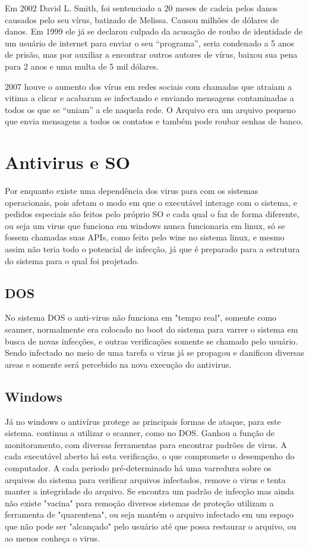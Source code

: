 	Em 2002 David L. Smith, foi sentenciado a 20 meses de cadeia pelos danos causados pelo seu vírus, batizado de Melissa. Causou milhões de dólares de danos. Em 1999 ele já se declarou culpado da acusação de roubo de identidade de um usuário de internet para enviar o seu “programa”, seria condenado a 5 anos de prisão, mas por auxiliar a encontrar outros autores de vírus, baixou sua pena para 2 anos e uma multa de 5 mil dólares.

	2007 houve o aumento dos vírus em redes sociais com chamadas que atraiam a vitima a clicar e acabaram se infectando e enviando mensagens contaminadas a todos os que se “uniam” a ele naquela rede. O Arquivo era um arquivo pequeno que envia mensagens a todos os contatos e também pode roubar senhas de banco.

\section{Antivirus e SO}
Por enquanto existe uma dependência dos virus para com os sistemas operacionais, pois afetam o modo em que o executável interage com o sistema, e pedidos especiais são feitos pelo próprio SO e cada qual o faz de forma diferente, ou seja um virus que funciona em windows nunca funcionaria em linux, só se fossem chamadas suas APIs, como feito pelo wine no sistema linux, e mesmo assim não teria todo o potencial de infecção, já que é preparado para a estrutura do sistema para o qual foi projetado.

\subsection{DOS}
No sistema DOS o anti-virus não funciona em "tempo real", somente como scanner, normalmente era colocado no boot do sistema para varrer o sistema em busca de novas infecções, e outras verificações somente se chamado pelo usuário. Sendo infectado no meio de uma tarefa o virus já se propagou e danificou diversas areas e somente será percebido na nova execução do antivirus.

\subsection{Windows}
Já no windows o antivírus protege as principais formas de ataque, para este sistema. 
continua a utilizar o scanner, como no DOS. 
Ganhou a função de monitoramento, com diversas ferramentas para encontrar padrões de virus. 
   A cada executável aberto há esta verificação, o que compromete o desempenho do computador.
A cada periodo pré-determinado há uma varredura sobre os arquivos do sistema para verificar arquivos infectados, remove o virus e tenta manter a integridade do arquivo.
Se encontra um padrão de infecção mas ainda não existe "vacina" para remoção diversos sistemas de proteção utilizam a ferramenta de "quarentena", ou seja mantém o arquivo infectado em um espaço que não pode ser "alcançado" pelo usuário até que possa restaurar o arquivo, ou ao menos conheça o virus.

